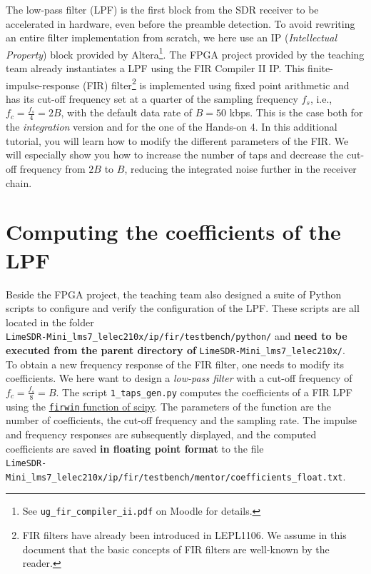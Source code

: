 

The low-pass filter (LPF) is the first block from the SDR receiver to be accelerated in hardware, even before the preamble detection. To avoid rewriting an entire filter implementation from scratch, we here use an IP (\textit{Intellectual Property}) block provided by Altera\footnote{See \texttt{ug\_fir\_compiler\_ii.pdf} on Moodle for details.}. The FPGA project provided by the teaching team already instantiates a LPF using the FIR Compiler II IP. This finite-impulse-response (FIR) filter\footnote{FIR filters
have already been introduced in LEPL1106. We assume in this document that the basic concepts of FIR filters are well-known by the reader.} is implemented using fixed point arithmetic and has its cut-off frequency set at a quarter of the sampling frequency $f_s$, i.e., $f_c = \frac{f_s}{4} = 2B$, with the default data rate of $B = 50$ kbps. This is the case both for the \textit{integration} version and for the one of the Hands-on 4. In this additional tutorial, you will learn how to modify the different parameters of the FIR. We will especially show you how to increase the number of taps and decrease the cut-off frequency from $2B$ to $B$, reducing the integrated noise further in the receiver chain.

\section{Computing the coefficients of the LPF}

Beside the FPGA project, the teaching team also designed a suite of Python scripts to configure and verify the configuration of the LPF. These scripts are all located in the folder \\ \texttt{LimeSDR-Mini\_lms7\_lelec210x/ip/fir/testbench/python/} and \textbf{need to be executed from the parent directory of} \texttt{LimeSDR-Mini\_lms7\_lelec210x/}. \\

To obtain a new frequency response of the FIR filter, one needs to modify its coefficients. We here want to design a \textit{low-pass filter} with a cut-off frequency of $f_c = \frac{f_s}{8} = B$.
The script \texttt{1\_taps\_gen.py} computes the coefficients of a FIR LPF using the \href{https://docs.scipy.org/doc/scipy/reference/generated/scipy.signal.firwin.html}{\texttt{firwin} function of scipy}. The parameters of the function are the number of coefficients, the cut-off frequency and the sampling rate. The impulse and frequency responses are subsequently displayed, and the computed coefficients are saved \textbf{in floating point format} to the file \\ \texttt{LimeSDR-Mini\_lms7\_lelec210x/ip/fir/testbench/mentor/coefficients\_float.txt}. \\

